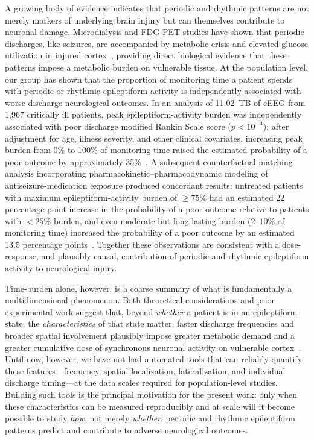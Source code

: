 \documentclass{iopjournal}
\begin{document}
A growing body of evidence indicates that periodic and rhythmic patterns are not merely markers of underlying brain injury but can themselves contribute to neuronal damage. Microdialysis and FDG-PET studies have shown that periodic discharges, like seizures, are accompanied by metabolic crisis and elevated glucose utilization in injured cortex~\cite{vespa2016,struck2016}, providing direct biological evidence that these patterns impose a metabolic burden on vulnerable tissue. At the population level, our group has shown that the proportion of monitoring time a patient spends with periodic or rhythmic epileptiform activity is independently associated with worse discharge neurological outcomes. In an analysis of 11.02~TB of cEEG from 1{,}967 critically ill patients, peak epileptiform-activity burden was independently associated with poor discharge modified Rankin Scale score ($p<10^{-4}$); after adjustment for age, illness severity, and other clinical covariates, increasing peak burden from 0\% to 100\% of monitoring time raised the estimated probability of a poor outcome by approximately 35\%~\cite{zafar2021}. A subsequent counterfactual matching analysis incorporating pharmacokinetic--pharmacodynamic modeling of antiseizure-medication exposure produced concordant results: untreated patients with maximum epileptiform-activity burden of $\geq 75\%$ had an estimated 22 percentage-point increase in the probability of a poor outcome relative to patients with $<25\%$ burden, and even moderate but long-lasting burden ($2$--$10\%$ of monitoring time) increased the probability of a poor outcome by an estimated 13.5 percentage points~\cite{parikh2023}. Together these observations are consistent with a dose-response, and plausibly causal, contribution of periodic and rhythmic epileptiform activity to neurological injury.

Time-burden alone, however, is a coarse summary of what is fundamentally a multidimensional phenomenon. Both theoretical considerations and prior experimental work suggest that, beyond \emph{whether} a patient is in an epileptiform state, the \emph{characteristics} of that state matter: faster discharge frequencies and broader spatial involvement plausibly impose greater metabolic demand and a greater cumulative dose of synchronous neuronal activity on vulnerable cortex~\cite{vespa2016,struck2016,claassen2004,gaspard2013}. Until now, however, we have not had automated tools that can reliably quantify these features---frequency, spatial localization, lateralization, and individual discharge timing---at the data scales required for population-level studies. Building such tools is the principal motivation for the present work: only when these characteristics can be measured reproducibly and at scale will it become possible to study \emph{how}, not merely \emph{whether}, periodic and rhythmic epileptiform patterns predict and contribute to adverse neurological outcomes.
\end{document}
